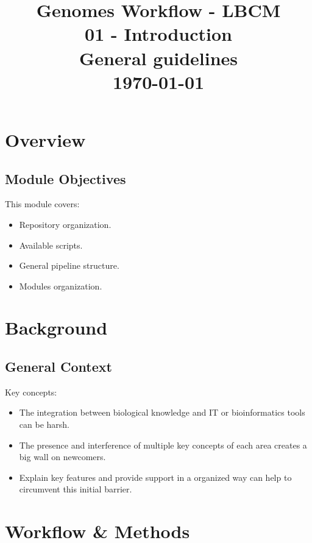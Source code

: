 \documentclass[a4paper,11pt]{article}
\title{
    \vfill
    \textcolor{noteblue}{\Huge Genomes Workflow - LBCM}\\
    \vspace{5.0cm}
    \textcolor{sidenotegray}{\huge 01 - Introduction}\\
    \vspace{1.5cm}
    \textcolor{sidenotegray}{\LARGE General guidelines}\\
    \vspace{5.0cm}
    \textcolor{sidenotegray}{\large \today}
    \vfill
}
\author{}
\date{}
\begin{document}
\maketitle
\thispagestyle{empty}
\newpage

\section{Overview}

\subsection{Module Objectives}

This module covers:
\begin{itemize}
    \item Repository organization.
    \item Available scripts.
    \item General pipeline structure.
    \item Modules organization.
\end{itemize}

\section{Background}

\subsection{General Context}

Key concepts:
\begin{itemize}
    \item The integration between biological knowledge and IT or
        bioinformatics tools can be harsh.
    \item The presence and interference of multiple key concepts of each area
        creates a big wall on newcomers.
    \item Explain key features and provide support in a organized way can help
        to circumvent this initial barrier.
\end{itemize}

\section{Workflow \& Methods}
\end{document}
